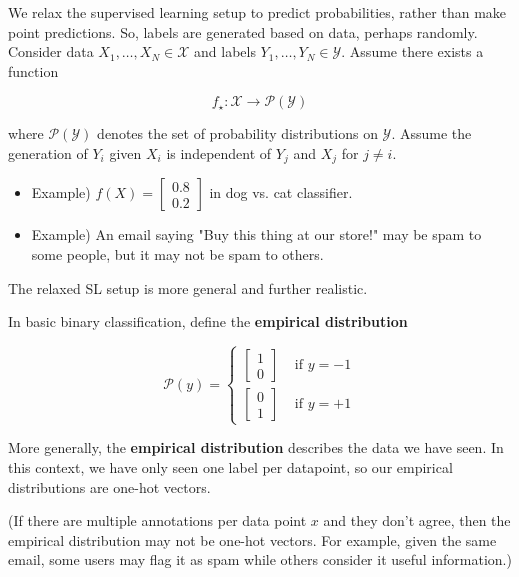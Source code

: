\begin{concept}
    We relax the supervised learning setup to predict probabilities, rather than make point predictions.
    So, labels are generated based on data, perhaps randomly.
    Consider data $X_{1}, \ldots, X_{N} \in \mathcal{X}$ and labels $Y_{1}, \ldots, Y_{N} \in \mathcal{Y}$. Assume there exists a function

    $$
    f_{\star}: \mathcal{X} \rightarrow \mathcal{P}(\mathcal{Y})
    $$

    where $\mathcal{P}(\mathcal{Y})$ denotes the set of probability distributions on $\mathcal{Y}$.
    Assume the generation of $Y_{i}$ given $X_{i}$ is independent of $Y_{j}$ and $X_{j}$ for $j \neq i$.

    \begin{itemize}
        \item Example) $f(X)=\left[\begin{array}{l}0.8 \\ 0.2\end{array}\right]$ in dog vs. cat classifier.
        \item Example) An email saying "Buy this thing at our store!" may be spam to some people, but it may not be spam to others.
    \end{itemize}

    The relaxed SL setup is more general and further realistic.
\end{concept}

\begin{definition}
    In basic binary classification, define the \textbf{empirical distribution}

    $$
    \mathcal{P}(y)= \begin{cases}{\left[\begin{array}{l}
    1 \\
    0
    \end{array}\right]} & \text { if } y=-1 \\
    {\left[\begin{array}{l}
    0 \\
    1
    \end{array}\right]} & \text { if } y=+1\end{cases}
    $$

    More generally, the \textbf{empirical distribution} describes the data we have seen.
    In this context, we have only seen one label per datapoint, so our empirical distributions are one-hot vectors.

    (If there are multiple annotations per data point $x$ and they don't agree, then the empirical distribution may not be one-hot vectors.
    For example, given the same email, some users may flag it as spam while others consider it useful information.)
\end{definition}

